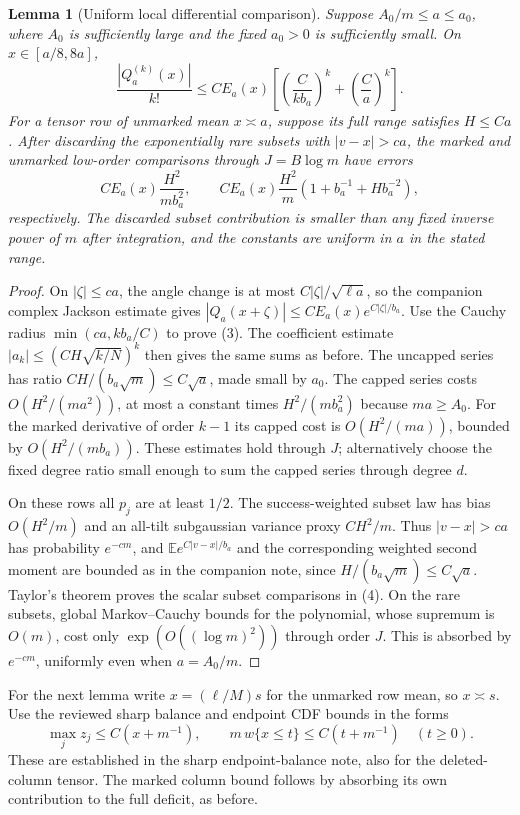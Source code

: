 \documentclass[11pt]{article}
\newtheorem{lemma}{Lemma}\newtheorem{theorem}{Theorem}
\newcommand{\E}{\mathbb E}
\begin{document}
\begin{lemma}[Uniform local differential comparison]\label{local}
Suppose $A_0/m\le a\le a_0$, where $A_0$ is sufficiently large
and the fixed $a_0>0$ is sufficiently small. On $x\in[a/8,8a]$,
\[
 \frac{|Q_a^{(k)}(x)|}{k!}
 \le C E_a(x)\left[\left(\frac C{kb_a}\right)^k
                               +\left(\frac Ca\right)^k\right].
                                                                    \tag{3}
\]
For a tensor row of unmarked mean $x\asymp a$, suppose its full
range satisfies $H\le C a$. After discarding the exponentially rare
subsets with $|v-x|>c a$, the marked and unmarked low-order comparisons
through $J=B\log m$ have errors
\[
 C E_a(x)\frac{H^2}{mb_a^2},\qquad
 C E_a(x)\frac{H^2}{m}(1+b_a^{-1}+Hb_a^{-2}),             \tag{4}
\]
respectively. The discarded subset contribution is smaller than any
fixed inverse power of $m$ after integration, and the constants are
uniform in $a$ in the stated range.
\end{lemma}
\begin{proof}
On $|\zeta|\le ca$, the angle change is at most
$C|\zeta|/\sqrt{\ell a}$, so the companion complex Jackson estimate
gives $|Q_a(x+\zeta)|\le C E_a(x)e^{C|\zeta|/b_a}$.
Use the Cauchy radius $\min(ca,kb_a/C)$ to prove (3).
The coefficient estimate $|a_k|\le(CH\sqrt{k/N})^k$ then gives the
same sums as before. The uncapped series has ratio
$CH/(b_a\sqrt m)\le C\sqrt a$, made small by $a_0$.
The capped series costs $O(H^2/(ma^2))$, at most a constant times
$H^2/(mb_a^2)$ because $ma\ge A_0$.
For the marked derivative of order $k-1$ its capped cost is
$O(H^2/(ma))$, bounded by $O(H^2/(mb_a))$.
These estimates hold through $J$; alternatively choose the fixed
degree ratio small enough to sum the capped series through degree $d$.

On these rows all $p_j$ are at least $1/2$. The success-weighted
subset law has bias $O(H^2/m)$ and an all-tilt subgaussian variance
proxy $CH^2/m$. Thus $|v-x|>ca$ has probability $e^{-cm}$, and
$\E e^{C|v-x|/b_a}$ and the corresponding weighted second moment
are bounded as in the companion note, since
$H/(b_a\sqrt m)\le C\sqrt a$.
Taylor's theorem proves the scalar subset comparisons in (4).
On the rare subsets, global Markov--Cauchy bounds for the polynomial,
whose supremum is $O(m)$, cost only $\exp(O((\log m)^2))$ through
order $J$. This is absorbed by $e^{-cm}$, uniformly even when
$a=A_0/m$.
\end{proof}

For the next lemma write $x=(\ell/M)s$ for the unmarked row mean,
so $x\asymp s$. Use the reviewed sharp balance and endpoint CDF
bounds in the forms
\begin{equation}\label{inputs}
 \max_jz_j\le C(x+m^{-1}),\qquad
 m\,w\{x\le t\}\le C(t+m^{-1})\quad(t\ge0).
\end{equation}
These are established in the sharp endpoint-balance note, also for
the deleted-column tensor. The marked column bound follows by
absorbing its own contribution to the full deficit, as before.
\end{document}
